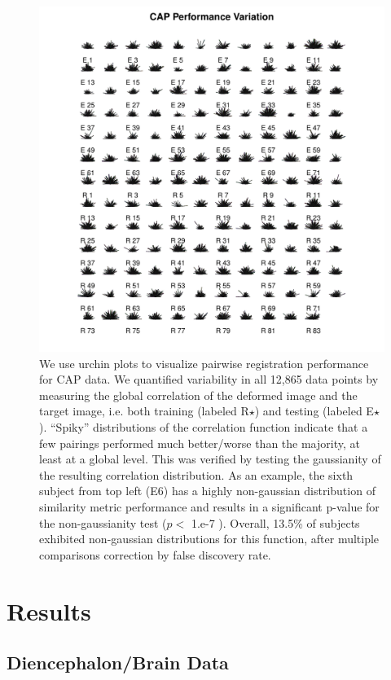 \documentclass{llncs}
\begin{document}
\begin{figure}[t]
 \centering 
  \includegraphics[width=5in]{../figs/spider_CAP.pdf}
 \caption{We use urchin plots to visualize pairwise registration
   performance for CAP data.  We quantified variability in
   all 12,865 data points by measuring
   the global correlation of the deformed image and the target image,
   i.e. both training (labeled R$\star$) and testing (labeled E$\star$). ``Spiky''
   distributions of the correlation function indicate that
 a few pairings performed much better/worse than the majority, at
 least at a global level.  This
 was verified by testing the gaussianity of the resulting correlation
 distribution.  As an example, the sixth subject from top left (E6) has a
 highly non-gaussian distribution of similarity metric performance and
results in a significant p-value for the non-gaussianity test ($p <$
1.e-7 ).  Overall, 13.5\% of subjects exhibited non-gaussian
distributions for this function, after multiple comparisons correction by false discovery rate.}
 \label{fig:CAPvar}
\end{figure}

\section{Results}

\subsection{Diencephalon/Brain Data}
\end{document}
